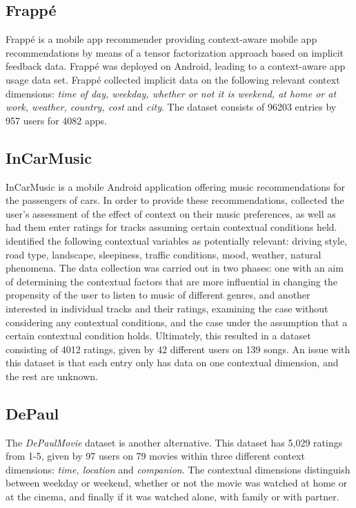 \subsection{Frappé}
Frappé is a mobile app recommender providing context-aware mobile app recommendations by means of a tensor factorization approach based on implicit feedback data\cite{baltrunas2015frappe}.
Frappé was deployed on Android, leading to a context-aware app usage data set.
Frappé collected implicit data on the following relevant context dimensions: \textit{time of day, weekday, whether or not it is weekend, at home or at work, weather, country, cost} and \textit{city}. 
The dataset consists of 96203 entries by 957 users for 4082 apps.

\subsection{InCarMusic}
InCarMusic is a mobile Android application offering music recommendations for the passengers of cars.
In order to provide these recommendations, \cite{InCarMusic2011} collected the user's assessment of the effect of context on their music preferences, as well as had them enter ratings for tracks assuming certain contextual conditions held.
\cite{InCarMusic2011} identified the following contextual variables as potentially relevant: driving style, road type, landscape, sleepiness, traffic conditions, mood, weather, natural phenomena.
The data collection was carried out in two phases: one with an aim of determining the contextual factors that are more influential in changing the propensity of the user to listen to music of different genres, and another interested in individual tracks and their ratings, examining the case without considering any contextual conditions, and the case under the assumption that a certain contextual condition holds.
Ultimately, this resulted in a dataset consisting of 4012 ratings, given by 42 different users on 139 songs.
An issue with this dataset is that each entry only has data on one contextual dimension, and the rest are unknown.

\subsection{DePaul}
The \textit{DePaulMovie} dataset is another alternative.
This dataset has 5,029 ratings from 1-5, given by 97 users on 79 movies within three different context dimensions: \textit{time, location} and \textit{companion}\cite{DePaulData}.
The contextual dimensions distinguish between weekday or weekend, whether or not the movie was watched at home or at the cinema, and finally if it was watched alone, with family or with partner.

